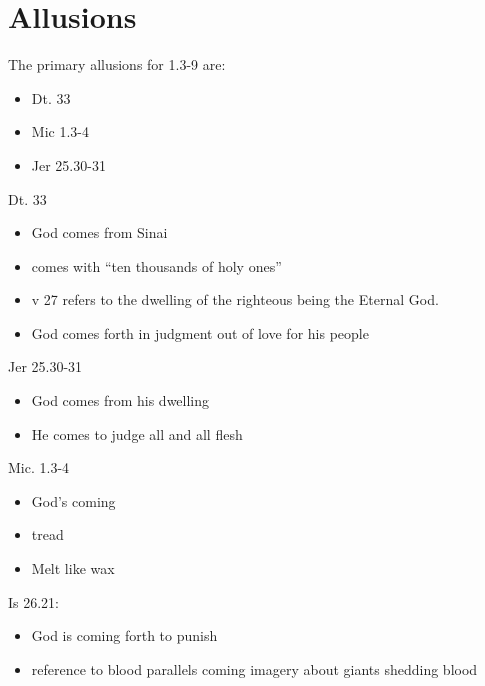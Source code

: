 \documentclass{beamer}
\begin{document}
\section{Allusions}

\begin{frame}
  The primary allusions for 1.3-9 are:\pause
  \begin{itemize}
	\item Dt. 33
	\item Mic 1.3-4
	\item Jer 25.30-31
  \end{itemize}
\end{frame}

\begin{frame}
  Dt. 33\pause
  \begin{itemize}
	\item God comes from Sinai\pause
	\item comes with ``ten thousands of holy ones''\pause
	\item v 27 refers to the dwelling of the righteous being the Eternal God.\pause
	\item God comes forth in judgment out of love for his people
  \end{itemize}
\end{frame}

\begin{frame}
  Jer 25.30-31\pause
  \begin{itemize}
	\item God comes from his dwelling\pause
	\item He comes to judge all and all flesh
  \end{itemize}
\end{frame}

\begin{frame}
  Mic. 1.3-4\pause
  \begin{itemize}
	\item God's coming\pause
	\item tread\pause
	\item Melt like wax
  \end{itemize}
\end{frame}

\begin{frame}
  Is 26.21:\pause
  \begin{itemize}
	\item God is coming forth to punish\pause
	\item reference to blood parallels coming imagery about giants shedding blood
  \end{itemize}
\end{frame}
\end{document}
